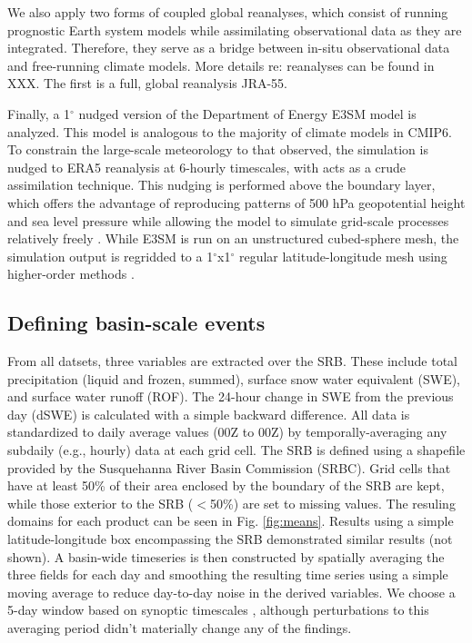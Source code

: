 \documentclass[draft]{agujournal2019}
\newcommand{\degree}{$^{\circ}$}
\begin{document}
We also apply two forms of coupled global reanalyses, which consist of running prognostic Earth system models while assimilating observational data as they are integrated. Therefore, they serve as a bridge between in-situ observational data and free-running climate models. More details re: reanalyses can be found in XXX. The first is a full, global reanalysis JRA-55. 

Finally, a 1\degree{} nudged version of the Department of Energy E3SM model is analyzed. This model is analogous to the majority of climate models in CMIP6. To constrain the large-scale meteorology to that observed, the simulation is nudged to ERA5 reanalysis at 6-hourly timescales, with acts as a crude assimilation technique. This nudging is performed above the boundary layer, which offers the advantage of reproducing patterns of 500 hPa geopotential height and sea level pressure while allowing the model to simulate grid-scale processes relatively freely \citep{sun2019impact}. While E3SM is run on an unstructured cubed-sphere mesh, the simulation output is regridded to a 1\degree{}x1\degree{} regular latitude-longitude mesh using higher-order methods \citep{hill2004architecture}. 

\subsection{Defining basin-scale events}

From all datsets, three variables are extracted over the SRB. These include total precipitation (liquid and frozen, summed), surface snow water equivalent (SWE), and surface water runoff (ROF). The 24-hour change in SWE from the previous day (dSWE) is calculated with a simple backward difference. All data is standardized to daily average values (00Z to 00Z) by temporally-averaging any subdaily (e.g., hourly) data at each grid cell. The SRB is defined using a shapefile provided by the Susquehanna River Basin Commission (SRBC). Grid cells that have at least 50\% of their area enclosed by the boundary of the SRB are kept, while those exterior to the SRB ($<$50\%) are set to missing values. The resuling domains for each product can be seen in Fig. \ref{fig:means}. Results using a simple latitude-longitude box encompassing the SRB demonstrated similar results (not shown). A basin-wide timeseries is then constructed by spatially averaging the three fields for each day and smoothing the resulting time series using a simple moving average to reduce day-to-day noise in the derived variables. We choose a 5-day window based on synoptic timescales \citep{holton2004introduction}, although perturbations to this averaging period didn't materially change any of the findings.
\end{document}
